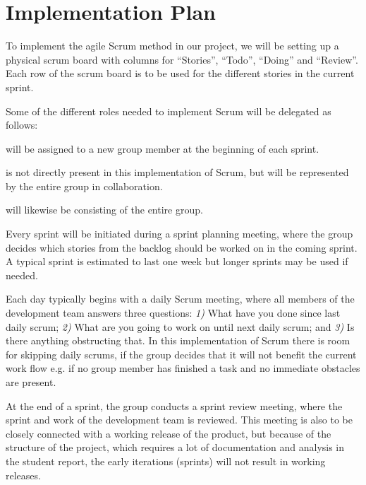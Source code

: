 \chapter{Implementation Plan} %
\label{cha:implementation_plan}
To implement the agile Scrum method in our project, we will be setting up a physical scrum board with columns for “Stories”, “Todo”, “Doing” and “Review”. Each row of the scrum board is to be used for the different stories in the current sprint. 

Some of the different roles needed to implement Scrum will be delegated as follows:
\vspace{-\topsep}
\begin{description}[labelindent=\parindent, labelwidth=\widthof{\bfseries The development team}, align=parright]
    \item[The Scrum master] will be assigned to a new group member at the beginning of each sprint.
    \item[The product owner] is not directly present in this implementation of Scrum, but will be represented by the entire group in collaboration.
    \item[The development team] will likewise be consisting of the entire group.
\end{description}

Every sprint will be initiated during a sprint planning meeting, where the group decides which stories from the backlog should be worked on in the coming sprint. 
A typical sprint is estimated to last one week but longer sprints may be used if needed. 

Each day typically begins with a daily Scrum meeting, where all members of the development team answers three questions: \emph{1)} What have you done since last daily scrum; \emph{2)} What are you going to work on until next daily scrum; and \emph{3)} Is there anything obstructing that. 
In this implementation of Scrum there is room for skipping daily scrums, if the group decides that it will not benefit the current work flow e.g. if no group member has finished a task and no immediate obstacles are present. 

At the end of a sprint, the group conducts a sprint review meeting, where the sprint and work of the development team is reviewed. 
This meeting is also to be closely connected with a working release of the product, but because of the structure of the project, which requires a lot of documentation and analysis in the student report, the early iterations (sprints) will not result in working releases.


